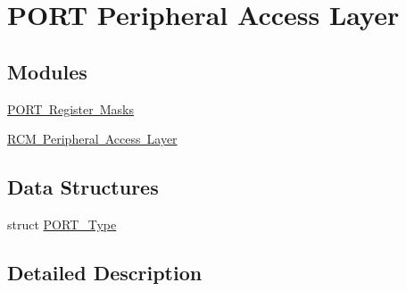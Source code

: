 \hypertarget{group___p_o_r_t___peripheral___access___layer}{}\section{P\+O\+RT Peripheral Access Layer}
\label{group___p_o_r_t___peripheral___access___layer}
\subsection*{Modules}
\begin{DoxyCompactItemize}
\item 
\mbox{\hyperlink{group___p_o_r_t___register___masks}{P\+O\+R\+T Register Masks}}
\item 
\mbox{\hyperlink{group___r_c_m___peripheral___access___layer}{R\+C\+M Peripheral Access Layer}}
\end{DoxyCompactItemize}
\subsection*{Data Structures}
\begin{DoxyCompactItemize}
\item 
struct \mbox{\hyperlink{struct_p_o_r_t___type}{P\+O\+R\+T\+\_\+\+Type}}
\end{DoxyCompactItemize}


\subsection{Detailed Description}

